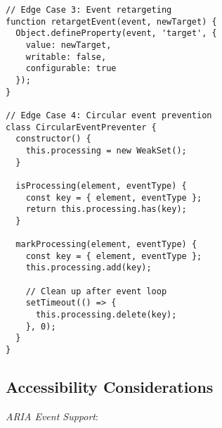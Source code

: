 \documentclass[11pt]{article}
\begin{document}
\begin{verbatim}
// Edge Case 3: Event retargeting
function retargetEvent(event, newTarget) {
  Object.defineProperty(event, 'target', {
    value: newTarget,
    writable: false,
    configurable: true
  });
}

// Edge Case 4: Circular event prevention
class CircularEventPreventer {
  constructor() {
    this.processing = new WeakSet();
  }
  
  isProcessing(element, eventType) {
    const key = { element, eventType };
    return this.processing.has(key);
  }
  
  markProcessing(element, eventType) {
    const key = { element, eventType };
    this.processing.add(key);
    
    // Clean up after event loop
    setTimeout(() => {
      this.processing.delete(key);
    }, 0);
  }
}
\end{verbatim}
\subsection{Accessibility Considerations}
\label{sec:org6cfee80}

\emph{ARIA Event Support}:
\end{document}
